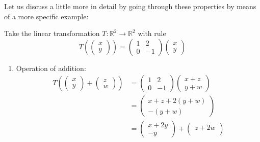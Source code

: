 \begin{exm}
	Let us discuss  a little more in detail
	by going through these properties by means of a more specific example:
	\begin{flushleft}
		Take the linear transformation $T:\mathbb{R}^2\to\mathbb{R}^2$ with rule
		\begin{equation*}
			T\left(\begin{pmatrix}
				x \\ y
			\end{pmatrix}\right)=\begin{pmatrix}
				1 & 2  \\
				0 & -1
			\end{pmatrix}\begin{pmatrix}
				x \\ y
			\end{pmatrix}
		\end{equation*}
		\begin{enumerate}
			\item Operation of addition:
			      \begin{align*}
				      T\left(\begin{pmatrix}
					      x \\ y
				      \end{pmatrix}+
				      \begin{pmatrix}
					      z \\ w
				      \end{pmatrix}\right)
				       & =\begin{pmatrix}
					      1 & 2  \\
					      0 & -1
				      \end{pmatrix}\begin{pmatrix}
					      x + z \\
					      y + w
				      \end{pmatrix}   \\
				       & =\begin{pmatrix}
					      x+z+2(y+w) \\
					      -(y+w)
				      \end{pmatrix}                             \\
				       & =\begin{pmatrix}
					      x + 2y \\
					      -y
				      \end{pmatrix}+
				      \begin{pmatrix}
					      z + 2w \\

\end{pmatrix}
\end{align*}
\end{enumerate}
\end{flushleft}
\end{exm}
